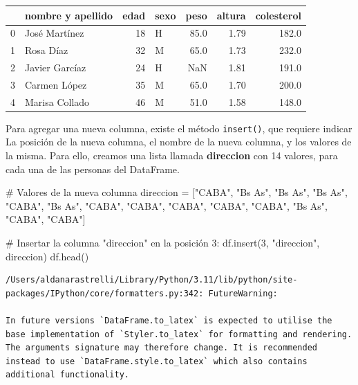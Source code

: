 \documentclass[
  letterpaper,
  DIV=11,
  numbers=noendperiod]{scrreprt}
\newenvironment{Shaded}{\begin{snugshade}}{\end{snugshade}}
\newcommand{\CommentTok}[1]{\textcolor[rgb]{0.37,0.37,0.37}{#1}}
\newcommand{\DecValTok}[1]{\textcolor[rgb]{0.68,0.00,0.00}{#1}}
\newcommand{\NormalTok}[1]{\textcolor[rgb]{0.00,0.23,0.31}{#1}}
\newcommand{\OperatorTok}[1]{\textcolor[rgb]{0.37,0.37,0.37}{#1}}
\newcommand{\StringTok}[1]{\textcolor[rgb]{0.13,0.47,0.30}{#1}}
\begin{document}
\begin{tabular}{llrlrrr}
\toprule
{} & nombre y apellido &  edad & sexo &  peso &  altura &  colesterol \\
\midrule
0 &     José Martínez &    18 &    H &  85.0 &    1.79 &       182.0 \\
1 &         Rosa Díaz &    32 &    M &  65.0 &    1.73 &       232.0 \\
2 &    Javier Garcíaz &    24 &    H &   NaN &    1.81 &       191.0 \\
3 &      Carmen López &    35 &    M &  65.0 &    1.70 &       200.0 \\
4 &    Marisa Collado &    46 &    M &  51.0 &    1.58 &       148.0 \\
\bottomrule
\end{tabular}

Para agregar una nueva columna, existe el método \texttt{insert()}, que
requiere indicar La posición de la nueva columna, el nombre de la nueva
columna, y los valores de la misma. Para ello, creamos una lista llamada
\textbf{direccion} con 14 valores, para cada una de las personas del
DataFrame.

\begin{Shaded}
\begin{Highlighting}[]
\CommentTok{\# Valores de la nueva columna}
\NormalTok{direccion }\OperatorTok{=}\NormalTok{ [}\StringTok{"CABA"}\NormalTok{, }\StringTok{"Bs As"}\NormalTok{, }\StringTok{"Bs As"}\NormalTok{, }\StringTok{"Bs As"}\NormalTok{, }\StringTok{"CABA"}\NormalTok{, }\StringTok{"Bs As"}\NormalTok{, }\StringTok{"CABA"}\NormalTok{, }\StringTok{"CABA"}\NormalTok{, }\StringTok{"CABA"}\NormalTok{, }\StringTok{"CABA"}\NormalTok{, }\StringTok{"CABA"}\NormalTok{, }\StringTok{"Bs As"}\NormalTok{, }\StringTok{"CABA"}\NormalTok{, }\StringTok{"CABA"}\NormalTok{]}

\CommentTok{\# Insertar la columna "direccion" en la posición 3:}
\NormalTok{df.insert(}\DecValTok{3}\NormalTok{, }\StringTok{"direccion"}\NormalTok{, direccion)}
\NormalTok{df.head()}
\end{Highlighting}
\end{Shaded}

\begin{verbatim}
/Users/aldanarastrelli/Library/Python/3.11/lib/python/site-packages/IPython/core/formatters.py:342: FutureWarning:

In future versions `DataFrame.to_latex` is expected to utilise the base implementation of `Styler.to_latex` for formatting and rendering. The arguments signature may therefore change. It is recommended instead to use `DataFrame.style.to_latex` which also contains additional functionality.
\end{verbatim}
\end{document}
